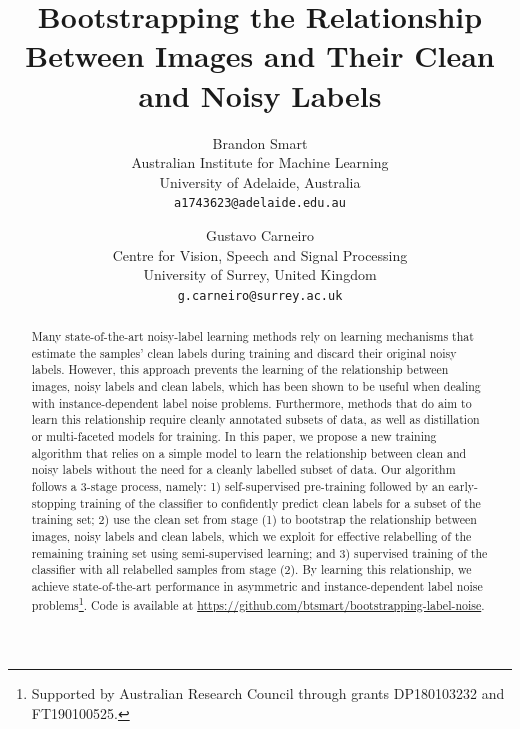 \documentclass[10pt,twocolumn,letterpaper]{article}
\begin{document}
\title{Bootstrapping the Relationship Between Images and Their Clean and Noisy Labels}

\author{Brandon Smart\\
Australian Institute for Machine Learning\\
University of Adelaide, Australia\\
{\tt\small a1743623@adelaide.edu.au}
\and
Gustavo Carneiro\\
Centre for Vision, Speech and Signal Processing\\
University of Surrey, United Kingdom\\
{\tt\small g.carneiro@surrey.ac.uk}
}

\maketitle

\begin{abstract}
    Many state-of-the-art noisy-label learning methods rely on learning mechanisms that estimate the samples' clean labels during training and discard their original noisy labels.
    However, this approach prevents the learning of the relationship between images, noisy labels and clean labels, which has been shown to be useful when dealing with instance-dependent label noise problems.
    Furthermore, methods that do aim to learn this relationship require cleanly annotated subsets of data, as well as distillation or multi-faceted models for training.
    In this paper, we propose a new training algorithm that relies on a simple model
    to learn the relationship between clean and noisy labels without the need for a cleanly labelled subset of data. 
    Our algorithm follows a 3-stage process, namely: 
    1) self-supervised pre-training followed by an early-stopping training of the classifier to confidently predict clean labels for a subset of the training set;
    2) use the clean set from stage (1) to bootstrap the relationship between images, noisy labels and clean labels, which we exploit for effective relabelling of the remaining training set using semi-supervised learning; and 
    3) supervised training of the classifier with all relabelled samples from stage (2). 
    By learning this relationship, we achieve state-of-the-art performance in asymmetric and instance-dependent label noise problems\footnote{Supported by Australian Research Council through grants DP180103232 and FT190100525.}. Code is available at \url{https://github.com/btsmart/bootstrapping-label-noise}.
\end{abstract}
\end{document}
